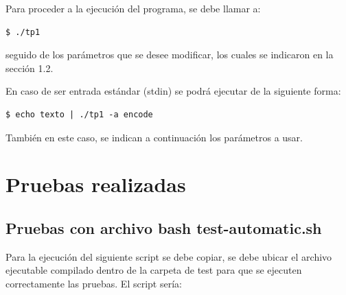 \documentclass[11pt,a4paper]{article}
\begin{document}
Para proceder a la ejecución del programa, se debe llamar a:

\begin{lstlisting}
$ ./tp1
\end{lstlisting}

seguido de los parámetros que se desee modificar, los cuales se indicaron en la sección 1.2.

En caso de ser entrada estándar (stdin) se podrá ejecutar de la siguiente forma:

\begin{lstlisting}
$ echo texto | ./tp1 -a encode
\end{lstlisting}

También en este caso, se indican a continuación los parámetros a usar.

\newpage


\section{Pruebas realizadas}


\subsection{Pruebas con archivo bash test-automatic.sh}
Para la ejecución del siguiente script se debe copiar, se debe ubicar el archivo ejecutable compilado dentro de la carpeta de test para que se ejecuten correctamente las pruebas. El script sería:
\end{document}
